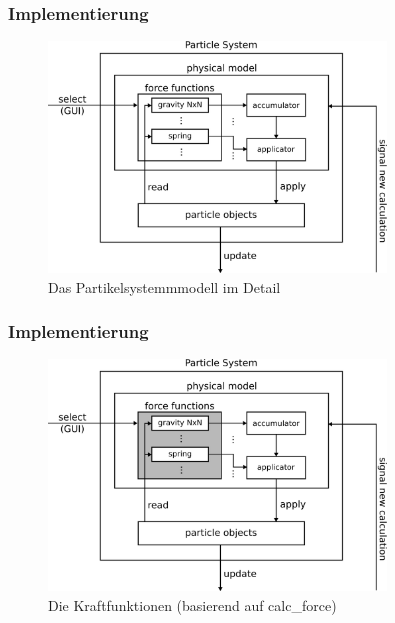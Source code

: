 \documentclass{beamer}
\begin{document}
\begin{frame}
\frametitle{Implementierung}
\begin{figure}[]
\centering
\includegraphics[width=0.8\textwidth]{../images/particle-system-detail.pdf}
\caption{Das Partikelsystemmmodell im Detail}
\label{fig:sysdiadetail}
\end{figure}
\end{frame}

\begin{frame}
\frametitle{Implementierung}
\begin{figure}[]
\centering
\includegraphics[width=0.8\textwidth]{images/detail1.pdf}
\caption{Die Kraftfunktionen (basierend auf calc\_force)}
\end{figure}
\end{frame}

%
\end{document}
